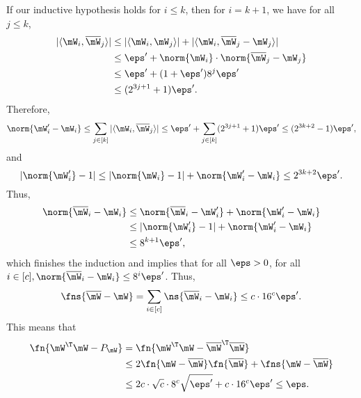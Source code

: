 \begin{proofof}{}
If our inductive hypothesis holds for $i\leq k$, then for $i=k+1$, we have for all $j\leq k$,
\begin{equation}\begin{split}
    |\langle \mW_i, \overline{\mW}_j\rangle|&\leq |\langle \mW_i, \mW_j\rangle| + |\langle \mW_i, \overline{\mW}_j-\mW_j\rangle|\\
    &\leq \eps'+ \norm{\mW_i}\cdot\norm{\overline{\mW}_j-\mW_j}
    \\
    &\leq \eps'+ (1+\eps')8^j\eps'\\
    &\leq (2^{3j+1}+1)\eps'.
\end{split}\end{equation}
Therefore,
\begin{equation}
    \norm{\mW_i'-\mW_i}\leq \sum_{j\in[k]} |\langle \mW_i, \overline{\mW}_j\rangle|\leq \eps'+\sum_{j\in[k]}(2^{3j+1}+1)\eps'\leq (2^{3k+2} - 1)\eps',
\end{equation}
and
\begin{equation}
    |\norm{\mW_i'}-1|\leq |\norm{\mW_i}-1| + \norm{\mW_i'-\mW_i}\leq 2^{3k+2}\eps'.
\end{equation}
Thus,
\begin{equation}\begin{split}
    \norm{\overline{\mW}_i-\mW_i}&\leq \norm{\overline{\mW}_i-\mW_i'} + \norm{\mW_i'-\mW_i}\\
                          &\leq |\norm{\mW_i'}-1| + \norm{\mW_i'-\mW_i}\\
                          &\leq 8^{k+1}\eps',
\end{split}\end{equation}
which finishes the induction and implies that for all $\eps>0$, for all $i\in[c], \norm{\overline{\mW}_i-\mW_i}\leq 8^{i}\eps'$. Thus,
\begin{equation}
\label{eqn:W-equal-W-bar}
    \fns{\overline{\mW}-\mW} = \sum_{i\in[c]} \ns{\overline{\mW}_i-\mW_i}\leq c\cdot 16^c\eps'.
\end{equation}
This means that
\begin{equation}\begin{split}
    \fn{\mW^\T\mW-P_\mW} &= \fn{\mW^\T\mW-\overline{\mW}^\T\overline{\mW}}\\
                  &\leq 2\fn{\mW-\overline{\mW}}\fn{\overline{\mW}} + \fns{\mW-\overline{\mW}}\\
                  &\leq 2c\cdot\sqrt{c}\cdot 8^c\sqrt{\eps'} + c\cdot 16^c\eps'\leq \eps.
\end{split}
\end{equation}
\end{proofof}

